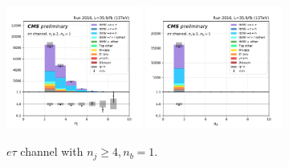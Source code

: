 \begin{figure}[ht]
    \includegraphics[width=0.4\textwidth]{chapters/Analysis/sectionPlots/figures/kinematics_pickles/etau/1b/etau_1b_nJets.pdf}
    \includegraphics[width=0.4\textwidth]{chapters/Analysis/sectionPlots/figures/kinematics_pickles/etau/1b/etau_1b_nBJets.pdf}
    
    \caption{$e\tau$ channel with $n_j\geq4, n_b=1$.}
\end{figure}

